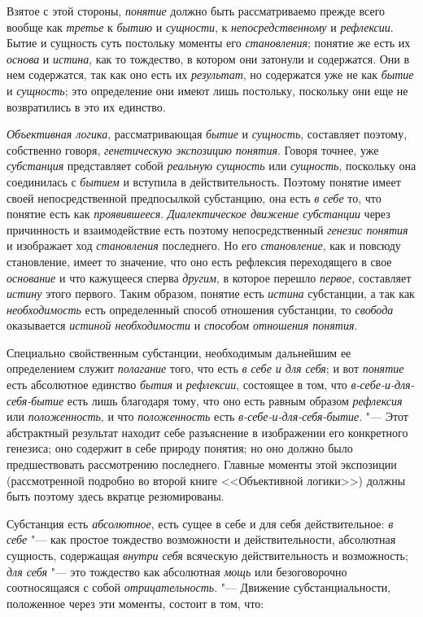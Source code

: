 Взятое с этой стороны, {\em понятие} должно быть рассматриваемо прежде всего
вообще как {\em третье} к {\em бытию} и {\em сущности}, к
{\em непосредственному} и {\em рефлексии}. Бытие и сущность суть постольку
моменты его {\em становления}; понятие же есть их {\em основа} и
{\em истина}, как то тождество, в котором они затонули и содержатся. Они в
нем содержатся, так как оно есть их {\em результат}, но содержатся уже не
как {\em бытие} и {\em сущность}; это определение они имеют лишь постольку,
поскольку они еще не возвратились в это их единство.

{\em Объективная логика}, рассматривающая {\em бытие} и {\em сущность},
составляет поэтому, собственно говоря, {\em генетическую экспозицию понятия}.
Говоря точнее, уже {\em субстанция} представляет собой {\em реальную сущность}
или {\em сущность}, поскольку она соединилась с {\em бытием} и вступила в
действительность. Поэтому понятие имеет своей непосредственной предпосылкой
субстанцию, она есть {\em в себе} то, что понятие есть как {\em проявившееся}.
{\em Диалектическое движение субстанции} через причинность и взаимодействие
есть поэтому непосредственный {\em генезис понятия} и изображает ход
{\em становления} последнего. Но его {\em становление}, как и
повсюду становление, имеет то значение, что оно есть рефлексия переходящего
в свое {\em основание} и что кажущееся сперва {\em другим}, в которое перешло
{\em первое}, составляет {\em истину} этого первого. Таким образом, понятие есть
{\em истина} субстанции, а так как {\em необходимость} есть определенный
способ отношения субстанции, то {\em свобода} оказывается {\em истиной
необходимости} и {\em способом отношения понятия}.

Специально свойственным субстанции, необходимым дальнейшим ее определением
служит {\em полагание} того, что есть {\em в себе и для себя}; и вот
{\em понятие} есть абсолютное единство {\em бытия} и {\em рефлексии},
состоящее в том, что {\em в-себе-и-для-себя-бытие} есть лишь благодаря тому,
что оно есть равным образом {\em рефлексия} или {\em положенность}, и что
{\em положенность} есть {\em в-себе-и-для-себя-бытие}. "--- Этот абстрактный
результат находит себе разъяснение в изображении его конкретного генезиса;
оно содержит в себе природу понятия; но оно должно было предшествовать
рассмотрению последнего. Главные моменты этой экспозиции (рассмотренной
подробно во второй книге <<Объективной логики>>) должны быть поэтому здесь
вкратце резюмированы.

Субстанция есть {\em абсолютное}, есть сущее в себе и для себя
действительное: {\em в себе} "--- как простое тождество возможности и
действительности, абсолютная сущность, содержащая {\em внутри себя}
всяческую действительность и возможность; {\em для себя} "--- это
тождество как абсолютная {\em мощь} или безоговорочно соотносящаяся с собой
{\em отрицательность}. "--- Движение субстанциальности, положенное через эти
моменты, состоит в том, что:

